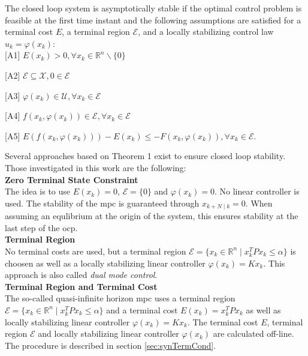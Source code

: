 \documentclass[10pt,a4paper,titlepage]{article}
\begin{document}
\begin{tcolorbox}[colback=gray!20, colframe=gray!80,title=Theorem 1,arc=0.0mm]
The closed loop system is asymptotically stable if the optimal control problem is feasible at the first time instant and
the following assumptions are satisfied for a terminal cost $E$, a terminal region $\mathcal{E}$, and a locally stabilizing
control law $u_{k}=\varphi\left(x_{k}\right)$:\\

[A1] $E\left(x_{k}\right)>0, \forall x_{k} \in \mathbb{R}^{n} \backslash\{0\}$

[A2]  $\mathcal{E} \subseteq \mathcal{X}, 0 \in \mathcal{E}$

[A3] $\varphi\left(x_{k}\right) \in \mathcal{U}, \forall x_{k} \in \mathcal{E}$

[A4] $f\left(x_{k}, \varphi\left(x_{k}\right)\right) \in \mathcal{E}, \forall x_{k} \in \mathcal{E}$

[A5] $E\left(f\left(x_{k}, \varphi\left(x_{k}\right)\right)\right)-E\left(x_{k}\right) \leq-F\left(x_{k}, \varphi\left(x_{k}\right)\right), \forall x_{k} \in \mathcal{E}$.
\end{tcolorbox}

Several approaches based on Theorem 1 exist to ensure closed loop stability. Those investigated in this work are the following:\\

\textbf{Zero Terminal State Constraint}\\
The idea is to use $E(x_k) = 0$, $\mathcal{E} = \{ 0 \}$ and $\varphi(x_{k}) = 0$. No linear controller is used.
The stability of the \gls{mpc} is guaranteed through $x_{k+N \mid k} = 0$. When assuming an equlibrium at the
origin of the system, this ensures stability at the last step of the \gls{ocp}.\\

\textbf{Terminal Region}\\
No terminal costs are used, but a terminal region $\mathcal{E} = \{x_k \in \mathbb{R}^n \mid x_k^TPx_k \leq \alpha \}$
is choosen as well as a locally stabilizing linear controller $\varphi(x_{k}) = K x_k$. This approach is also called
\textit{dual mode control}.\\

\textbf{Terminal Region and Terminal Cost}\\
The so-called quasi-infinite horizon \gls{mpc} uses a terminal region $\mathcal{E} = \{x_k \in \mathbb{R}^n \mid x_k^TPx_k \leq \alpha \}$
and a terminal cost $E(x_k) = x_k^T P x_k$ as well as locally stabilizing linear controller $\varphi(x_{k}) = K x_k$.
The terminal cost $E$, terminal region $\mathcal{E}$ and locally stabilizing linear controller $\varphi(x_{k})$ are 
calculated off-line. The procedure is described in section \ref{sec:synTermCond}.
\end{document}
